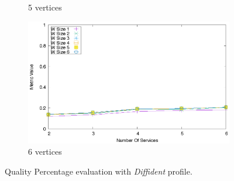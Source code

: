 \begin{figure}[ht!]
\begin{subfigure}{0.33\textwidth}
    \caption{5 vertices}
    \label{fig:quality_window_bad_percentage_c}
  \end{subfigure}
  \hfill
  \begin{subfigure}{0.33\textwidth}
    \includegraphics[width=\textwidth]{Images/graphs/quality_plot_bad_percentage_n6.eps}
    \caption{6 vertices}
    \label{fig:quality_window_bad_percentage_d}
  \end{subfigure}

  \caption{Quality Percentage evaluation with \textit{Diffident} profile.}
  \label{fig:quality_window_bad_percentage}
\end{figure}


